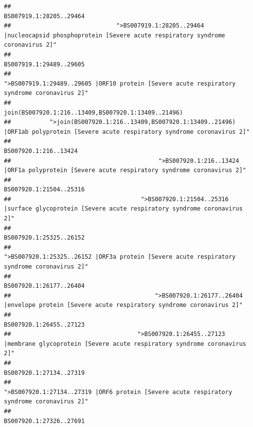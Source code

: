 \documentclass[
]{article}
\begin{document}
\begin{verbatim}
##                                                                                                                BS007919.1:28205..29464 
##                              ">BS007919.1:28205..29464 |nucleocapsid phosphoprotein [Severe acute respiratory syndrome coronavirus 2]" 
##                                                                                                                BS007919.1:29489..29605 
##                                            ">BS007919.1:29489..29605 |ORF10 protein [Severe acute respiratory syndrome coronavirus 2]" 
##                                                                                    join(BS007920.1:216..13409,BS007920.1:13409..21496) 
##           ">join(BS007920.1:216..13409,BS007920.1:13409..21496) |ORF1ab polyprotein [Severe acute respiratory syndrome coronavirus 2]" 
##                                                                                                                  BS007920.1:216..13424 
##                                          ">BS007920.1:216..13424 |ORF1a polyprotein [Severe acute respiratory syndrome coronavirus 2]" 
##                                                                                                                BS007920.1:21504..25316 
##                                     ">BS007920.1:21504..25316 |surface glycoprotein [Severe acute respiratory syndrome coronavirus 2]" 
##                                                                                                                BS007920.1:25325..26152 
##                                            ">BS007920.1:25325..26152 |ORF3a protein [Severe acute respiratory syndrome coronavirus 2]" 
##                                                                                                                BS007920.1:26177..26404 
##                                         ">BS007920.1:26177..26404 |envelope protein [Severe acute respiratory syndrome coronavirus 2]" 
##                                                                                                                BS007920.1:26455..27123 
##                                    ">BS007920.1:26455..27123 |membrane glycoprotein [Severe acute respiratory syndrome coronavirus 2]" 
##                                                                                                                BS007920.1:27134..27319 
##                                             ">BS007920.1:27134..27319 |ORF6 protein [Severe acute respiratory syndrome coronavirus 2]" 
##                                                                                                                BS007920.1:27326..27691 

\end{verbatim}
\end{document}
